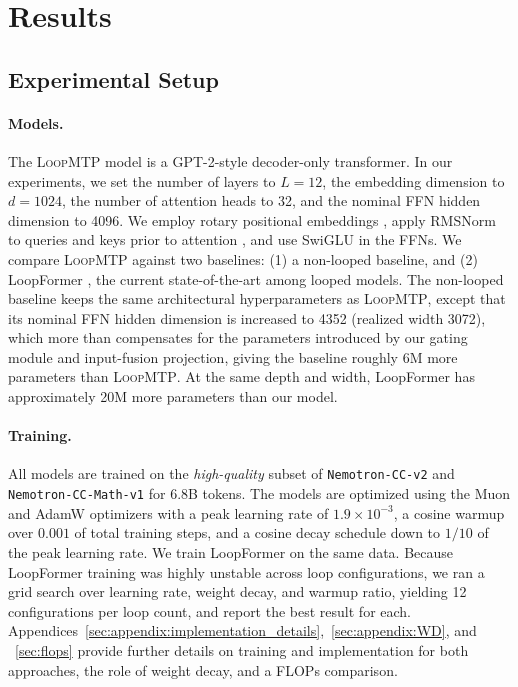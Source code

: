 \section{Results}
\label{sec:results}

\subsection{Experimental Setup}





\paragraph{Models.} 

The \textsc{LoopMTP} model is a GPT-2-style decoder-only transformer. In our experiments, we set the number of layers to $L=12$, the embedding dimension to $d=1024$, the number of attention heads to 32, and the nominal FFN hidden dimension to 4096. We employ rotary positional embeddings \citep{su2024roformer}, apply RMSNorm to queries and keys prior to attention \citep{henry2020query, dehghani2023scaling}, and use SwiGLU \citep{shazeer2020glu} in the FFNs. 
We compare \textsc{LoopMTP} against two baselines: (1) a non-looped baseline, and (2) LoopFormer \citep{jeddi2026loopformer}, the current state-of-the-art among looped models. The non-looped baseline keeps the same architectural hyperparameters as \textsc{LoopMTP}, except that its nominal FFN hidden dimension is increased to 4352 (realized width 3072), which more than compensates for the parameters introduced by our gating module and input-fusion projection, giving the baseline roughly 6M more parameters than \textsc{LoopMTP}.
At the same depth and width, LoopFormer has approximately 20M more parameters than our model.


\paragraph{Training.}

All models are trained on the \textit{high-quality} subset of \texttt{Nemotron-CC-v2} \citep{nvidia2025nvidianemotronnano2} and \texttt{Nemotron-CC-Math-v1} \citep{mahabadi2025nemotron} for 6.8B tokens. The models are optimized using the Muon \citep{liu2025muon} and AdamW \citep{loshchilov2017decoupled} optimizers with a peak learning rate of $1.9\times10^{-3}$, a cosine warmup over $0.001$ of total training steps, and a cosine decay schedule down to $1/10$ of the peak learning rate. We train LoopFormer on the same data. Because LoopFormer training was highly unstable across loop configurations, we ran a grid search over learning rate, weight decay, and warmup ratio, yielding 12 configurations per loop count, and report the best result for each.
Appendices~\ref{sec:appendix:implementation_details},~\ref{sec:appendix:WD}, and ~\ref{sec:flops}
provide further details on training and implementation for both approaches, the role of weight decay, and a FLOPs comparison.






